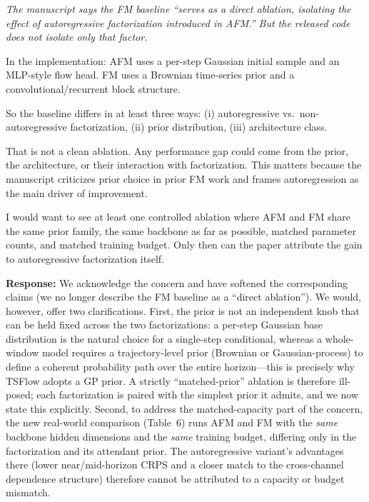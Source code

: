 \documentclass[11pt]{article}
\newcommand{\reviewertext}[1]{%
  \begin{reviewerquote}
    {\color{reviewercolor}\itshape #1}
  \end{reviewerquote}%
}
\newcommand{\authorresponse}[1]{%
  \textbf{Response:} #1\par\medskip
}
\begin{document}
\reviewertext{%
The manuscript says the FM baseline ``serves as a direct ablation, isolating the effect of autoregressive factorization introduced in AFM.'' But the released code does not isolate only that factor.

In the implementation: AFM uses a per-step Gaussian initial sample and an MLP-style flow head. FM uses a Brownian time-series prior and a convolutional/recurrent block structure.

So the baseline differs in at least three ways: (i) autoregressive vs.\ non-autoregressive factorization, (ii) prior distribution, (iii) architecture class.

That is not a clean ablation. Any performance gap could come from the prior, the architecture, or their interaction with factorization. This matters because the manuscript criticizes prior choice in prior FM work and frames autoregression as the main driver of improvement.

I would want to see at least one controlled ablation where AFM and FM share the same prior family, the same backbone as far as possible, matched parameter counts, and matched training budget. Only then can the paper attribute the gain to autoregressive factorization itself.
}

\authorresponse{%
We acknowledge the concern and have softened the corresponding claims (we no longer describe the FM baseline as a ``direct ablation''). We would, however, offer two clarifications. First, the prior is not an independent knob that can be held fixed across the two factorizations: a per-step Gaussian base distribution is the natural choice for a single-step conditional, whereas a whole-window model requires a trajectory-level prior (Brownian or Gaussian-process) to define a coherent probability path over the entire horizon---this is precisely why TSFlow adopts a GP prior. A strictly ``matched-prior'' ablation is therefore ill-posed; each factorization is paired with the simplest prior it admits, and we now state this explicitly. Second, to address the matched-capacity part of the concern, the new real-world comparison (Table~6) runs AFM and FM with the \emph{same} backbone hidden dimensions and the \emph{same} training budget, differing only in the factorization and its attendant prior. The autoregressive variant's advantages there (lower near/mid-horizon CRPS and a closer match to the cross-channel dependence structure) therefore cannot be attributed to a capacity or budget mismatch.

}
\end{document}
